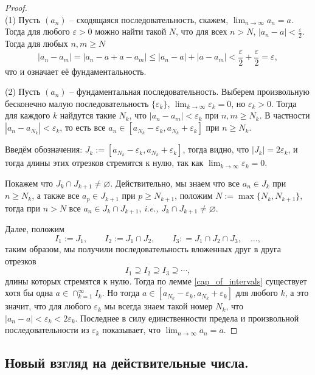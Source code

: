 \begin{proof}~\\
(1) Пусть $(a_n)$ -- сходящаяся последовательность, скажем, $\lim_{n \to \infty}a_n = a$. Тогда для любого $\varepsilon>0$ можно найти такой $N$, что для всех $n>N$, $|a_n - a| < \frac{\varepsilon}{2}$. Тогда для любых $n,m \ge N$
    \[
     |a_n - a_m| = |a_n - a + a - a_m| \le |a_n - a| + |a - a_m| < \frac{\varepsilon}{2} + \frac{\varepsilon}{2} =\varepsilon,
    \]
    что и означает её фундаментальность.

(2) Пусть $(a_n)$ -- фундаментальная последовательность. Выберем произвольную бесконечно малую последовательность $\{\varepsilon_k\}$, \ie $\lim_{k \to \infty} \varepsilon_k = 0$, но $\varepsilon_k >0$. Тогда для каждого $k$ найдутся такие $N_k$, что $|a_n - a_m| < \varepsilon_k$ при $n,m \ge N_k$. В частности $|a_n - a_{N_k}|<\varepsilon_k$, то есть все $a_n \in [a_{N_k}-\varepsilon_k, a_{N_k}+\varepsilon_k]$ при $n\ge N_k$.

Введём обозначения: $J_k:=[a_{N_k}-\varepsilon_k, a_{N_k}+\varepsilon_k]$, тогда видно, что $|J_k| = 2\varepsilon_k$, и тогда длины этих отрезков стремятся к нулю, так как $\lim_{k \to \infty} \varepsilon_k = 0$.

Покажем что $J_k \cap J_{k+1} \ne \varnothing$. Действительно, мы знаем что все $a_n \in J_k$ при $n\ge N_k$, а также все $a_p \in J_{k+1}$ при $p \ge N_{k+1}$, положим $N:=\max\{N_k,N_{k+1}\}$, тогда при $n>N$ все $a_n \in J_k \cap J_{k+1}$, \textit{i.e.,}  $J_k \cap J_{k+1} \ne \varnothing$.

Далее, положим
\[
 I_1:=J_1, \qquad I_2:=J_1 \cap J_2, \qquad I_3: = J_1 \cap J_2 \cap J_3,\quad  \ldots,
\]
таким образом, мы получили последовательность вложенных друг в друга отрезков 
\[
I_1 \supseteq I_2 \supseteq I_3 \supseteq \cdots,
\]
длины которых стремятся к нулю. Тогда по лемме \ref{cap_of_intervals} существует хотя бы одна $a \in \cap_{k=1}^\infty I_k$. Но тогда $a \in [a_{N_k}-\varepsilon_k, a_{N_k}+\varepsilon_k]$ для любого $k$, а это значит, что для любого $\varepsilon_k$ мы всегда знаем такой номер $N_k$, что $|a_n - a|<\varepsilon_k<2 \varepsilon_k$. Последнее в силу единственности предела и произвольной последовательности из $\varepsilon_k$ показывает, что $\lim_{n\to \infty}a_n = a$.
\end{proof}

\subsection{Новый взгляд на действительные числа.}\label{barQ=R}


